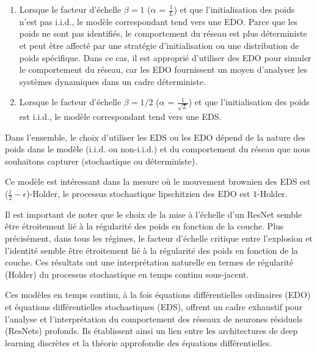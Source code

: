 \begin{enumerate}
    \item Lorsque le facteur d'échelle $\beta = 1 $ ($\alpha$ = $\frac{1}{L}$) et que l'initialisation des poids n'est pas i.i.d., le modèle correspondant tend vers une EDO.
    Parce que les poids ne sont pas identifiés, le comportement du réseau est plus déterministe et peut être affecté par une stratégie d'initialisation ou une distribution de poids spécifique. Dans ce cas, il est approprié d'utiliser des EDO pour simuler le comportement du réseau, car les EDO fournissent un moyen d'analyser les systèmes dynamiques dans un cadre déterministe.
    \item Lorsque le facteur d'échelle $\beta = 1/2 $ ($\alpha$ = $\frac{1}{\sqrt{L}}$) et que l'initialisation des poids est i.i.d., le modèle correspondant tend vers une EDS.
\end{enumerate}
Dans l'ensemble, le choix d'utiliser les EDS ou les EDO dépend de la nature des poids dans le modèle (i.i.d. ou non-i.i.d.) et du comportement du réseau que nous souhaitons capturer (stochastique ou déterministe).

Ce modèle est intéressant dans la mesure où le mouvement brownien des EDS est ($\frac{1}{2}-\epsilon$)-Holder, le processus stochastique lipschitzien des EDO est $1$-Holder.

Il est important de noter que le choix de la mise à l'échelle d'un ResNet semble être étroitement lié à la régularité des poids en fonction de la couche. Plus précisément, dans tous les régimes, le facteur d'échelle critique entre l'explosion et l'identité semble être étroitement lié à la régularité des poids en fonction de la couche. Ces résultats ont une interprétation naturelle en termes de régularité (Holder) du processus stochastique en temps continu sous-jacent.

Ces modèles en temps continu, à la fois équations différentielles ordinaires (EDO) et équations différentielles stochastiques (EDS), offrent un cadre exhaustif pour l'analyse et l'interprétation du comportement des réseaux de neurones résiduels (ResNets) profonds. Ils établissent ainsi un lien entre les architectures de deep learning discrètes et la théorie approfondie des équations différentielles.
